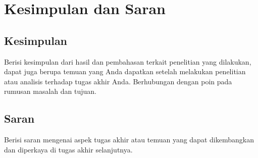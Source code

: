 \newpage
\chapter{Kesimpulan dan Saran} \label{Bab V}

\section{Kesimpulan} \label{V.Kesimpulan}
Berisi kesimpulan dari hasil dan pembahasan terkait penelitian yang dilakukan, dapat juga berupa temuan yang Anda dapatkan setelah melakukan penelitian atau analisis terhadap tugas akhir Anda. Berhubungan dengan poin pada rumusan masalah dan tujuan. 

\section{Saran} \label{V.Saran}
Berisi saran mengenai aspek tugas akhir atau temuan yang dapat dikembangkan dan diperkaya di tugas akhir selanjutnya. 